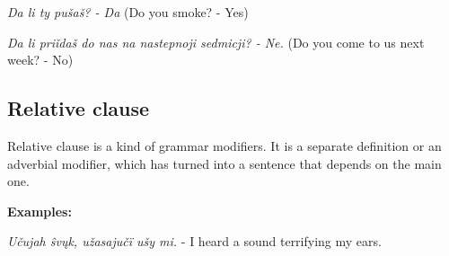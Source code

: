 \textit{Da li ty pušaš? - Da} (Do you smoke? - Yes)

\textit{Da li priǐdaš do nas na nastepnoji sedmicji? - Ne.} (Do you come to us next week? - No)

\subsection{Relative clause}

Relative clause is a kind of grammar modifiers. It is a separate definition or an adverbial modifier, which has turned into a sentence that depends on the main one.

\textbf{Examples:}

\textit{Učujah ŝvųk, užasajučï ušy mi.} - I heard a sound terrifying my ears.